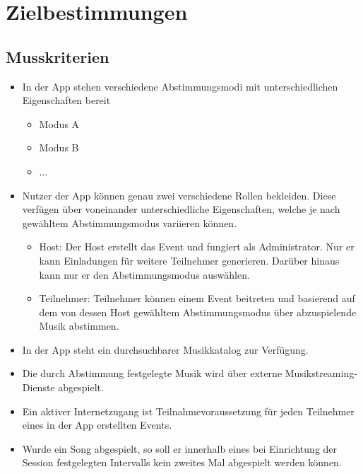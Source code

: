 \documentclass[oneside, ngerman]{sdqtechreport}
\begin{document}
\chapter{Zielbestimmungen}
\label{chap:Zielbestimmungen}

\section{Musskriterien}
\label{sec:Zielbestimmungen:Musskriterien}
\begin{itemize}
    \item In der App stehen verschiedene Abstimmungsmodi mit unterschiedlichen Eigenschaften bereit
    \begin{itemize}
        \item Modus A
        \item Modus B
        \item ...
    \end{itemize}
    \item Nutzer der App können genau zwei verschiedene Rollen bekleiden. Diese verfügen über voneinander unterschiedliche Eigenschaften, welche je nach gewähltem Abstimmungsmodus variieren können.
    \begin{itemize}
        \item Host: Der Host erstellt das Event und fungiert als Administrator. Nur er kann Einladungen für weitere Teilnehmer generieren. Darüber hinaus kann nur er den Abstimmungsmodus auswählen.
        \item Teilnehmer: Teilnehmer können einem Event beitreten und basierend auf dem von dessen Host gewähltem Abstimmungsmodus über abzuspielende Musik abstimmen.
    \end{itemize}
    \item In der App steht ein durchsuchbarer Musikkatalog zur Verfügung.
    \item Die durch Abstimmung festgelegte Musik wird über externe Musikstreaming-Dienste abgespielt.
    \item Ein aktiver Internetzugang ist Teilnahmevoraussetzung für jeden Teilnehmer eines in der App erstellten Events.
    \item Wurde ein Song abgespielt, so soll er innerhalb eines bei Einrichtung der Session festgelegten Intervalls kein zweites Mal abgespielt werden können.

\end{itemize}
\end{document}
